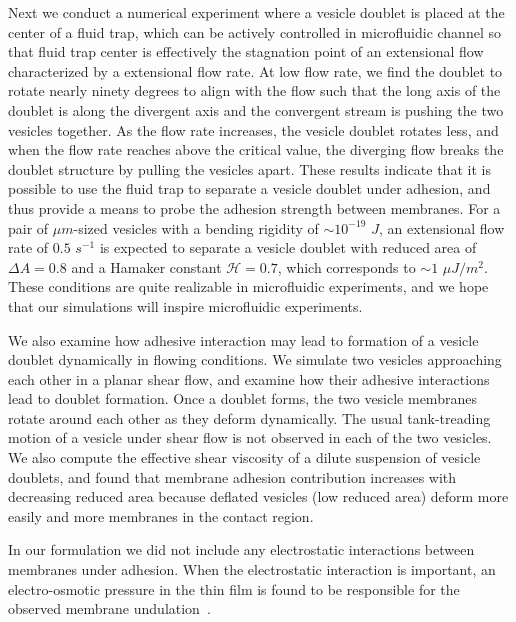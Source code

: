 \documentclass[prf,superscriptaddress,showpacs]{revtex4-1}
\begin{document}
Next we conduct a numerical experiment where a vesicle doublet is placed
at the center of a fluid trap, which can be actively controlled in
microfluidic channel so that fluid trap center is effectively the
stagnation point of an extensional flow characterized by a extensional
flow rate.  At low flow rate, we find the doublet to rotate nearly ninety
degrees to align with the flow such that the long axis of the doublet is
along the divergent axis and the convergent stream is pushing the two
vesicles together. As the flow rate increases, the vesicle doublet
rotates less, and when the flow rate reaches above the critical value,
the diverging flow breaks the doublet structure by pulling the vesicles
apart.  These results indicate that it is possible to use the fluid trap
to separate a vesicle doublet under adhesion, and thus provide a means
to probe the adhesion strength between membranes.  For a pair of $\mu
m$-sized vesicles with a bending rigidity of $\sim 10^{-19}$ $J$, an
extensional flow rate of $0.5$ $s^{-1}$ is expected to separate a
vesicle doublet with reduced area of $\Delta A = 0.8$ and a Hamaker
constant $\mathcal{H}=0.7$, which corresponds to $\sim 1$ $\mu J/m^2$.
These conditions are quite realizable in microfluidic experiments, and
we hope that our simulations will inspire microfluidic experiments.

We also examine how adhesive interaction may lead to formation of a
vesicle doublet dynamically in flowing conditions.  We simulate two
vesicles approaching each other in a planar shear flow, and examine how
their adhesive interactions lead to doublet formation.  Once a doublet
forms, the two vesicle membranes rotate around each other as they deform
dynamically. The usual tank-treading motion of a vesicle under shear
flow is not observed in each of the two vesicles. We also compute the
effective shear viscosity of a dilute suspension of vesicle doublets,
and found that membrane adhesion contribution increases with decreasing
reduced area because deflated vesicles (low reduced area) deform more
easily and more membranes in the contact region.

In our formulation we did not include any electrostatic interactions
between membranes under adhesion. When the electrostatic interaction is
important, an electro-osmotic pressure in the thin film is found to be
responsible for the observed membrane
undulation~\cite{SteinkuhlerAgudo-Canalejo2016_BJ}.
\end{document}
